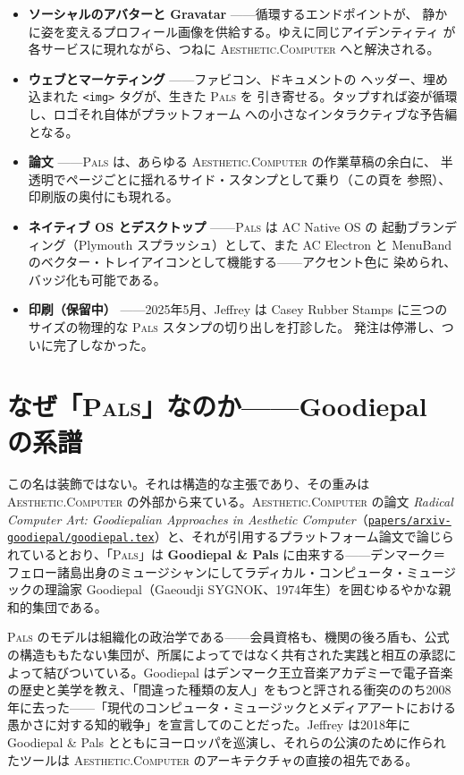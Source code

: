 \documentclass[10pt,letterpaper,twocolumn]{article}
\newcommand{\ac}{\textsc{Aesthetic}{\color{acpink}.}\textsc{Computer}}
\newcommand{\pals}{\textsc{Pals}}
\newcommand{\repofile}[1]{\href{https://github.com/whistlegraph/aesthetic-computer/blob/main/#1}{\texttt{#1}}}
\begin{document}
\begin{itemize}
  \item \textbf{ソーシャルのアバターと Gravatar} ——循環するエンドポイントが、
        静かに姿を変えるプロフィール画像を供給する。ゆえに同じアイデンティティ
        が各サービスに現れながら、つねに \ac{} へと解決される。
  \item \textbf{ウェブとマーケティング} ——ファビコン、ドキュメントの
        ヘッダー、埋め込まれた \texttt{<img>} タグが、生きた \pals{} を
        引き寄せる。タップすれば姿が循環し、ロゴそれ自体がプラットフォーム
        への小さなインタラクティブな予告編となる。
  \item \textbf{論文} ——\pals{} は、あらゆる \ac{} の作業草稿の余白に、
        半透明でページごとに揺れるサイド・スタンプとして乗り（この頁を
        参照）、印刷版の奥付にも現れる。
  \item \textbf{ネイティブ OS とデスクトップ} ——\pals{} は AC Native OS の
        起動ブランディング（Plymouth スプラッシュ）として、また AC Electron
        と MenuBand のベクター・トレイアイコンとして機能する——アクセント色に
        染められ、バッジ化も可能である。
  \item \textbf{印刷（保留中）} ——2025年5月、Jeffrey は Casey Rubber Stamps
        に三つのサイズの物理的な \pals{} スタンプの切り出しを打診した。
        発注は停滞し、ついに完了しなかった。
\end{itemize}

\section{なぜ「\pals{}」なのか——Goodiepal の系譜}

この名は装飾ではない。それは構造的な主張であり、その重みは \ac{} の外部から来ている。\ac{} の論文 \emph{Radical Computer Art: Goodiepalian Approaches in Aesthetic Computer}（\repofile{papers/arxiv-goodiepal/goodiepal.tex}）と、それが引用するプラットフォーム論文で論じられているとおり、「\pals{}」は \textbf{Goodiepal \& Pals} に由来する——デンマーク＝フェロー諸島出身のミュージシャンにしてラディカル・コンピュータ・ミュージックの理論家 Goodiepal（Gaeoudji SYGNOK、1974年生）を囲むゆるやかな親和的集団である。

\pals{} のモデルは組織化の政治学である——会員資格も、機関の後ろ盾も、公式の構造ももたない集団が、所属によってではなく共有された実践と相互の承認によって結びついている。Goodiepal はデンマーク王立音楽アカデミーで電子音楽の歴史と美学を教え、「間違った種類の友人」をもつと評される衝突ののち2008年に去った——「現代のコンピュータ・ミュージックとメディアアートにおける愚かさに対する知的戦争」を宣言してのことだった。Jeffrey は2018年に Goodiepal \& Pals とともにヨーロッパを巡演し、それらの公演のために作られたツールは \ac{} のアーキテクチャの直接の祖先である。
\end{document}

